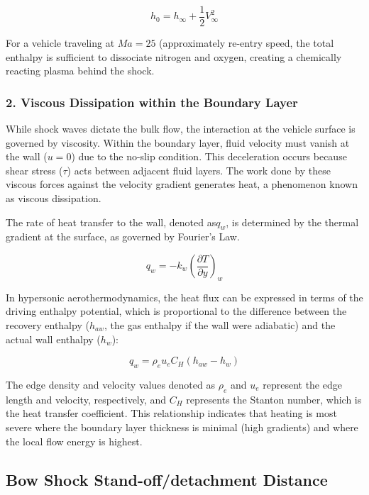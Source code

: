 \begin{equation}
    h_0 = h_{\infty} + \frac{1}{2} V_{\infty}^2
\end{equation}

For a vehicle traveling at $Ma = 25$ (approximately re-entry speed, the total enthalpy is sufficient to dissociate nitrogen and oxygen, creating a chemically reacting plasma behind the shock.

\subsubsection*{2. Viscous Dissipation within the Boundary Layer}
While shock waves dictate the bulk flow, the interaction at the vehicle surface is governed by viscosity. Within the boundary layer, fluid velocity must vanish at the wall ($u=0$) due to the no-slip condition. This deceleration occurs because shear stress ($\tau$) acts between adjacent fluid layers. The work done by these viscous forces against the velocity gradient generates heat, a phenomenon known as viscous dissipation.
\par
The rate of heat transfer to the wall, denoted as$q_w$, is determined by the thermal gradient at the surface, as governed by Fourier's Law.

\begin{equation}
    q_w = -k_w \left( \frac{\partial T}{\partial y} \right)_{w}
\end{equation}

In hypersonic aerothermodynamics, the heat flux can be expressed in terms of the driving enthalpy potential, which is proportional to the difference between the recovery enthalpy ($h_{aw}$, the gas enthalpy if the wall were adiabatic) and the actual wall enthalpy ($h_w$):

\begin{equation}
    q_w = \rho_e u_e C_H (h_{aw} - h_w)
\end{equation}

The edge density and velocity values denoted as $\rho_e$ and $u_e$ represent the edge length and velocity, respectively, and $C_H$ represents the Stanton number, which is the heat transfer coefficient. This relationship indicates that heating is most severe where the boundary layer thickness is minimal (high gradients) and where the local flow energy is highest.


\subsection{Bow Shock Stand-off/detachment Distance}

